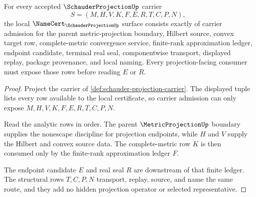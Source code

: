 \begin{theorem}
\label{thm:schauder-projection-namecert-obligations}
For every accepted $\SchauderProjectionUp$ carrier
$$
S=(M,H,V,K,F,E,R,T,C,P,N),
$$
the local $\NameCert_{\SchauderProjectionUp}$ surface consists exactly of carrier admission for the parent metric-projection boundary, Hilbert source, convex target row, complete-metric convergence service, finite-rank approximation ledger, endpoint candidate, terminal real seal, componentwise transport, displayed replay, package provenance, and local naming. Every projection-facing consumer must expose those rows before reading $E$ or $R$.
\end{theorem}
\begin{proof}
Project the carrier of \autoref{def:schauder-projection-carrier}. The displayed tuple lists every row available to the local certificate, so carrier admission can only expose $M,H,V,K,F,E,R,T,C,P,N$.

Read the analytic rows in order. The parent $\MetricProjectionUp$ boundary supplies the nonescape discipline for projection endpoints, while $H$ and $V$ supply the Hilbert and convex source data. The complete-metric row $K$ is then consumed only by the finite-rank approximation ledger $F$.

The endpoint candidate $E$ and real seal $R$ are downstream of that finite ledger. The structural rows $T,C,P,N$ transport, replay, source, and name the same route, and they add no hidden projection operator or selected representative.
\end{proof}

